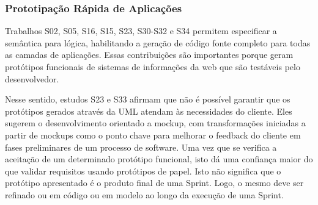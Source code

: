 

%




\subsubsection{Prototipação Rápida de Aplicações}

Trabalhos  %
S02, S05, S16, S15, S23, S30-S32 e S34 permitem especificar a semântica para lógica, habilitando a geração de código fonte completo para todas as camadas de aplicações. Essas contribuições são importantes porque geram protótipos funcionais de sistemas de informações da web que são testáveis pelo desenvolvedor. 

Nesse sentido, estudos S23 e S33 afirmam que não é possível garantir que os protótipos gerados através da UML atendam às necessidades do cliente. Eles sugerem o desenvolvimento orientado a mockup, com transformações iniciadas a partir de mockups como o ponto chave para melhorar o feedback do cliente em fases preliminares de um processo de software. Uma vez que se verifica a aceitação de um determinado protótipo funcional, isto dá uma confiança maior do que validar requisitos usando protótipos de papel. Isto não significa que o protótipo apresentado é o produto final de uma Sprint. Logo, o mesmo deve ser refinado ou em código ou em modelo ao longo da execução de uma Sprint.

